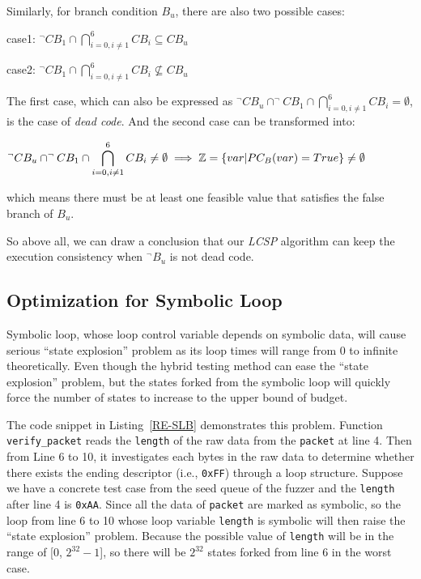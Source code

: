 Similarly, for branch condition $B_u$, there are also two possible cases:
\begin{center}
case1: $\displaystyle ^\neg CB_1 \cap \bigcap\limits_{i=0,i\neq 1}^6 CB_i \subseteq CB_u$

case2: $\displaystyle ^\neg CB_1 \cap \bigcap\limits_{i=0,i\neq 1}^6 CB_i \nsubseteq CB_u$
\end{center}

The first case, which can also be expressed as $^\neg CB_u \cap ^\neg CB_1 \cap \bigcap_{i=0,i\neq 1}^6 CB_i = \emptyset$, is the case of \emph{dead code}. And the second case can be transformed into:
\begin{center}
$\displaystyle ^\neg CB_u \cap ^\neg CB_1 \cap \bigcap\limits_{i=0,i\neq 1}^6 CB_i \neq \emptyset \implies \mathbb{Z} = \{var\arrowvert PC_B(var) = True\} \neq \emptyset$
\end{center}

\noindent which means there must be at least one feasible value that satisfies the false branch of $B_u$.

So above all, we can draw a conclusion that our \emph{LCSP} algorithm can keep the execution consistency when $^\neg B_u$ is not dead code.

\subsection{Optimization for Symbolic Loop}
Symbolic loop, whose loop control variable depends on symbolic data, will cause serious ``state explosion'' problem as its loop times will range from 0 to infinite theoretically. 
Even though the hybrid testing method can ease the ``state explosion'' problem, but the states forked from the symbolic loop will quickly force the number of states to increase to the upper bound of budget. 

 

The code snippet in Listing~\ref{RE-SLB} demonstrates this problem. Function \texttt{verify\_packet} reads the \texttt{length} of the raw data from the \texttt{packet} at line 4.
 Then from Line 6 to 10, it investigates each bytes in the raw data to determine whether there exists the ending descriptor (i.e., \texttt{0xFF}) through a loop structure. 
 Suppose we have a concrete test case from the seed queue of the fuzzer and the \texttt{length} after line 4 is \texttt{0xAA}. 
 Since all the data of \texttt{packet} are marked as symbolic, so the loop from line 6 to 10 whose loop variable \texttt{length} is symbolic will then raise the ``state explosion'' problem.
 Because the possible value of \texttt{length} will be in the range of [0, $2^{32}-1$], so there will be $2^{32}$ states forked from line 6 in the worst case. 
 
